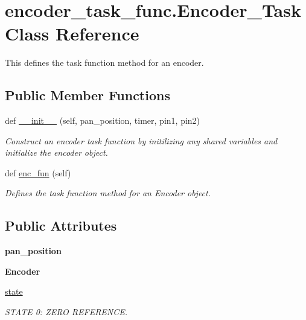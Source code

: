 \hypertarget{classencoder__task__func_1_1Encoder__Task}{}\section{encoder\+\_\+task\+\_\+func.\+Encoder\+\_\+\+Task Class Reference}
\label{classencoder__task__func_1_1Encoder__Task}


This defines the task function method for an encoder.  


\subsection*{Public Member Functions}
\begin{DoxyCompactItemize}
\item 
def \hyperlink{classencoder__task__func_1_1Encoder__Task_aefce5b42f1f0e53b2fae5b253696f514}{\+\_\+\+\_\+init\+\_\+\+\_\+} (self, pan\+\_\+position, timer, pin1, pin2)
\begin{DoxyCompactList}\small\item\em Construct an encoder task function by initilizing any shared variables and initialize the encoder object. \end{DoxyCompactList}\item 
def \hyperlink{classencoder__task__func_1_1Encoder__Task_aae20c9351ed173a6dd575031abf971a8}{enc\+\_\+fun} (self)\hypertarget{classencoder__task__func_1_1Encoder__Task_aae20c9351ed173a6dd575031abf971a8}{}\label{classencoder__task__func_1_1Encoder__Task_aae20c9351ed173a6dd575031abf971a8}

\begin{DoxyCompactList}\small\item\em Defines the task function method for an Encoder object. \end{DoxyCompactList}\end{DoxyCompactItemize}
\subsection*{Public Attributes}
\begin{DoxyCompactItemize}
\item 
{\bfseries pan\+\_\+position}\hypertarget{classencoder__task__func_1_1Encoder__Task_af0b170e05f2b75892241fca13544947c}{}\label{classencoder__task__func_1_1Encoder__Task_af0b170e05f2b75892241fca13544947c}

\item 
{\bfseries Encoder}\hypertarget{classencoder__task__func_1_1Encoder__Task_a7a8534a9b079061213a9a17952674985}{}\label{classencoder__task__func_1_1Encoder__Task_a7a8534a9b079061213a9a17952674985}

\item 
\hyperlink{classencoder__task__func_1_1Encoder__Task_a0a42069639ece3d0a4cc3ae7a45a9feb}{state}
\begin{DoxyCompactList}\small\item\em S\+T\+A\+TE 0\+: Z\+E\+RO R\+E\+F\+E\+R\+E\+N\+CE. \end{DoxyCompactList}\end{DoxyCompactItemize}


